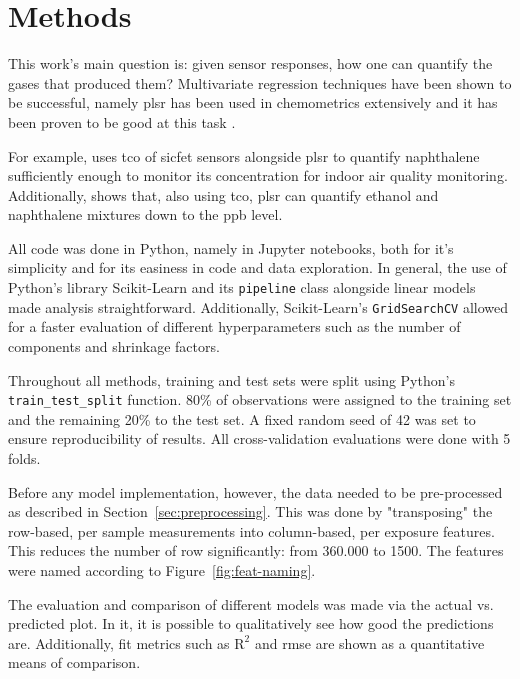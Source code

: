 \chapter{Methods}
\label{cha:methods}

This work's main question is: given sensor responses, how one can quantify the gases that produced them? Multivariate regression techniques have been shown to be successful, namely \acrfull{plsr} has been used in chemometrics extensively and it has been proven to be good at this task \parencite{Bastuck_2019} \parencite{wold2011}.

For example, \textcite{BUR2015225} uses \acrshort{tco} of \acrshort{sicfet} sensors alongside \acrshort{plsr} to quantify naphthalene sufficiently enough to monitor its concentration for indoor air quality monitoring. Additionally, \textcite{BASTUCK2016263} shows that, also using \acrshort{tco}, \acrshort{plsr} can  quantify ethanol and naphthalene mixtures down to the \acrfull{ppb} level.

All code was done in Python, namely in Jupyter notebooks, both for it's simplicity and for its easiness in code and data exploration. In general, the use of Python's library Scikit-Learn and its \texttt{pipeline} class alongside linear models made analysis straightforward. Additionally, Scikit-Learn's \texttt{GridSearchCV} allowed for a faster evaluation of different hyperparameters such as the number of components and shrinkage factors. 

Throughout all methods, training and test sets were split using Python's \texttt{train\_test\_split} function. 80\% of observations were assigned to the training set and the remaining 20\% to the test set. A fixed random seed of 42 was set to ensure reproducibility of results. All cross-validation evaluations were done with 5 folds.

Before any model implementation, however, the data needed to be pre-processed as described in Section~\ref{sec:preprocessing}. This was done by "transposing" the row-based, per sample  measurements into column-based, per exposure features. This reduces the number of row significantly: from 360.000 to 1500. The features were named according to Figure~\ref{fig:feat-naming}.

The evaluation and comparison of different models was made via the actual vs. predicted  plot. In it, it is possible to qualitatively see how good the predictions are. Additionally, fit metrics such as $\text{R}^2$ and \acrshort{rmse} are shown as a quantitative means of comparison.

